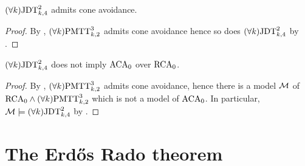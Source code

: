 \begin{corollary}\label{cor:jdt4-cone-avoidance}
$(\forall k)\mathrm{JDT}^{2}_{k, 4}$ admits cone avoidance.
\end{corollary}
\begin{proof}
By , $(\forall k)\mathrm{PMTT}^{3}_{k,2}$ admits cone avoidance
hence so does $(\forall k)\mathrm{JDT}^{2}_{k, 4}$ by .
\end{proof}

\begin{corollary}\label{cor:cone-avoidance-joyce-devlin-4-colors}
$(\forall k)\mathrm{JDT}^{2}_{k, 4}$  does not imply $\mathrm{ACA}_0$ over $\mathrm{RCA}_0$.
\end{corollary}
\begin{proof}
By , $(\forall k)\mathrm{PMTT}^{3}_{k,2}$ admits cone avoidance,
hence there is a model $\mathcal{M}$ of $\mathrm{RCA}_0 \wedge (\forall k)\mathrm{PMTT}^{3}_{k,2}$ which is not a model of $\mathrm{ACA}_0$.
In particular, $\mathcal{M} \models (\forall k)\mathrm{JDT}^{2}_{k, 4}$ by .
\end{proof}

\section{The Erd\H{o}s Rado theorem}\label{subsect:er-theorem}

